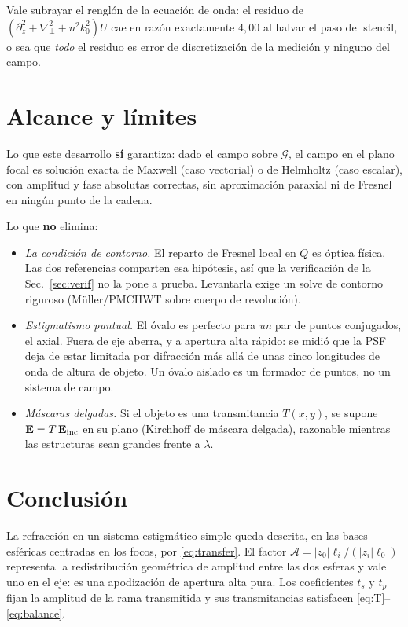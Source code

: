 \documentclass[11pt,a4paper]{article}
\newcommand{\E}{\mathbf{E}}
\begin{document}
Vale subrayar el renglón de la ecuación de onda: el residuo de
$(\partial_z^2+\nabla_\perp^2+n^2k_0^2)U$ cae en razón exactamente $4{,}00$ al
halvar el paso del stencil, o sea que \emph{todo} el residuo es error de
discretización de la medición y ninguno del campo.

\section{Alcance y límites}

Lo que este desarrollo \textbf{sí} garantiza: dado el campo sobre
$\mathcal{G}$, el campo en el plano focal es solución exacta de Maxwell (caso
vectorial) o de Helmholtz (caso escalar), con amplitud y fase absolutas
correctas, sin aproximación paraxial ni de Fresnel en ningún punto de la
cadena.

Lo que \textbf{no} elimina:
\begin{itemize}
  \item \emph{La condición de contorno.} El reparto de Fresnel local en $Q$ es
    óptica física. Las dos referencias comparten esa hipótesis, así que la
    verificación de la Sec.~\ref{sec:verif} no la pone a prueba. Levantarla
    exige un solve de contorno riguroso (Müller/PMCHWT sobre cuerpo de
    revolución).
  \item \emph{Estigmatismo puntual.} El óvalo es perfecto para \emph{un} par
    de puntos conjugados, el axial. Fuera de eje aberra, y a apertura alta
    rápido: se midió que la PSF deja de estar limitada por difracción más allá
    de unas cinco longitudes de onda de altura de objeto. Un óvalo aislado es
    un formador de puntos, no un sistema de campo.
  \item \emph{Máscaras delgadas.} Si el objeto es una transmitancia
    $T(x,y)$, se supone $\E=T\,\E_{\rm inc}$ en su plano (Kirchhoff de máscara
    delgada), razonable mientras las estructuras sean grandes frente a
    $\lambda$.
\end{itemize}

\section{Conclusión}

La refracción en un sistema estigmático simple queda descrita, en las bases
esféricas centradas en los focos, por \eqref{eq:transfer}. El factor
$\mathcal{A}=|z_0|\ell_i/(|z_i|\ell_0)$ representa la redistribución
geométrica de amplitud entre las dos esferas y vale uno en el eje: es una
apodización de apertura alta pura. Los coeficientes $t_s$ y $t_p$ fijan la
amplitud de la rama transmitida y sus transmitancias satisfacen
\eqref{eq:T}--\eqref{eq:balance}.
\end{document}
